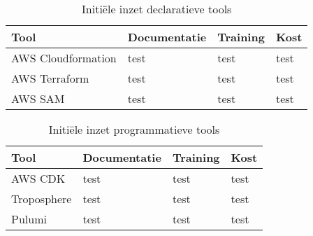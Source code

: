 \begin{table}[h]
    \label{tab:inzet-2}
    \begin{tabular}{  l p{3.4cm}  p{3.4cm} p{3.4cm} }
        \toprule
        \textbf{Tool}      & \textbf{Documentatie} & \textbf{Training} & \textbf{Kost} \\\midrule
        AWS Cloudformation & test                  & test              & test          \\\hline
        AWS Terraform      & test                  & test              & test          \\\hline
        AWS SAM            & test                  & test              & test          \\\hline
        \bottomrule
    \end{tabular}
    \caption{Initiële inzet declaratieve tools}
\end{table}

\begin{table}[h]
    \label{tab:inzet-3}
    \begin{tabular}{  l p{3.4cm}  p{3.4cm} p{3.4cm} }
        \toprule
        \textbf{Tool} & \textbf{Documentatie} & \textbf{Training} & \textbf{Kost} \\\midrule
        AWS CDK       & test                  & test              & test          \\\hline
        Troposphere   & test                  & test              & test          \\\hline
        Pulumi        & test                  & test              & test          \\\hline
        \bottomrule
    \end{tabular}
    \caption{Initiële inzet programmatieve tools}
\end{table}


